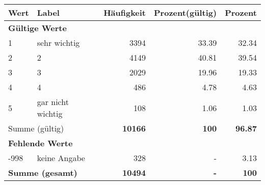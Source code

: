      \begin{longtable}{lXrrr}
     \toprule
     \textbf{Wert} & \textbf{Label} & \textbf{Häufigkeit} & \textbf{Prozent(gültig)} & \textbf{Prozent} \\
     \endhead
     \midrule
     \multicolumn{5}{l}{\textbf{Gültige Werte}}\\

     1 &
     \multicolumn{1}{X}{ sehr wichtig   } &


       \num{3394} &
       \num[round-mode=places,round-precision=2]{33,39} &
         \num[round-mode=places,round-precision=2]{32,34} \\

     2 &
     \multicolumn{1}{X}{ 2   } &


       \num{4149} &
       \num[round-mode=places,round-precision=2]{40,81} &
         \num[round-mode=places,round-precision=2]{39,54} \\

     3 &
     \multicolumn{1}{X}{ 3   } &


       \num{2029} &
       \num[round-mode=places,round-precision=2]{19,96} &
         \num[round-mode=places,round-precision=2]{19,33} \\

     4 &
     \multicolumn{1}{X}{ 4   } &


       \num{486} &
       \num[round-mode=places,round-precision=2]{4,78} &
         \num[round-mode=places,round-precision=2]{4,63} \\

     5 &
     \multicolumn{1}{X}{ gar nicht wichtig   } &


       \num{108} &
       \num[round-mode=places,round-precision=2]{1,06} &
         \num[round-mode=places,round-precision=2]{1,03} \\
     \midrule
     \multicolumn{2}{l}{Summe (gültig)} &
       \textbf{\num{10166}} &
     \textbf{100} &
       \textbf{\num[round-mode=places,round-precision=2]{96,87}} \\
     \multicolumn{5}{l}{\textbf{Fehlende Werte}}\\
       -998 &
       keine Angabe &
         \num{328} &
        - &
         \num[round-mode=places,round-precision=2]{3,13} \\
     \midrule
     \multicolumn{2}{l}{\textbf{Summe (gesamt)}} &
          \textbf{\num{10494}} &
        \textbf{-} &
        \textbf{100} \\
     \bottomrule
     \end{longtable}
     
